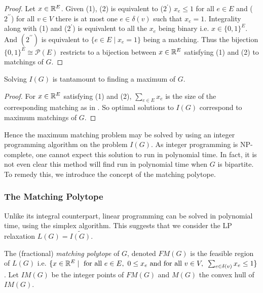 \begin{proof}
    Let $x \in \mathbb{R}^E$. Given  (1),  (2) is equivalent to ($2^{\prime}$) $x_e \leq 1$ for all $e \in E$ and ($2^{\prime \prime}$) for all $v \in V$ there is at most one $e \in \delta(v)$ such that $x_e = 1$. 
    Integrality along with  (1) and ($2^{\prime}$) is equivalent to all the $x_e$ being binary i.e. $x \in \{0,1\}^E$.
    And $(2^{\prime \prime})$ is equivalent to $\{e \in E \mid x_e = 1\}$ being a matching.
    Thus the bijection $\{0,1\}^E \cong \mathcal{P}(E)$ restricts to a bijection between $x \in \mathbb{R}^E$ satisfying  (1) and (2) to matchings of $G$.
    \end{proof}

\begin{corollary}
    Solving $I(G)$ is tantamount to finding a maximum of $G$.
\end{corollary}

\begin{proof}
    For $x \in \mathbb{R}^E$ satisfying  (1) and (2), $\sum_{e \in E} x_e$ is the size of the corresponding matching as in .
    So optimal solutions to $I(G)$ correspond to maximum matchings of $G$.
\end{proof}

Hence the maximum matching problem may be solved by using an integer programming algorithm on the problem $I(G)$.
As integer programming is NP-complete, one cannot expect this solution to run in polynomial time.
In fact, it is not even clear this method will find run in polynomial time when $G$ is bipartite.
To remedy this, we introduce the concept of the matching polytope.

\subsubsection{The Matching Polytope}\label{matchingpolytope}

Unlike its integral counterpart, linear programming can be solved in polynomial time, using the simplex algorithm.
This suggests that we consider the LP relaxation $L(G) = \widetilde{I(G)}$.

\begin{definition}
    The (fractional) \textit{matching polytope} of $G$, denoted $FM(G)$ is the feasible region of $L(G)$ i.e. $\{x \in \mathbb{R}^E \mid \text{ for all }e \in E,\text{ }0 \leq x_e \text{ and for all $v \in V,\text{ }\sum_{e \in \delta(v)} x_e \leq 1$}\}$.
    Let $IM(G)$ be the integer points of $FM(G)$ and $M(G)$ the convex hull of $IM(G)$.
\end{definition}

